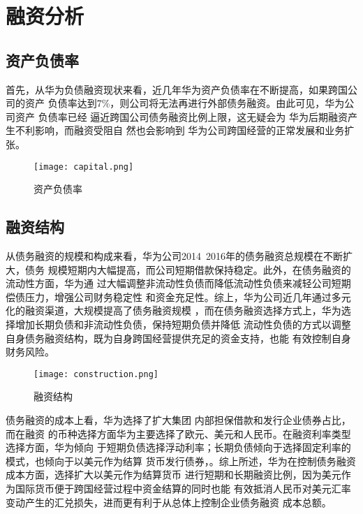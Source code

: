 \documentclass[../main]{subfiles}
\begin{document}
\chapter{融资分析}%
\label{cha:融资分析}

\section{资产负债率}%
\label{sec:资产负债率}

首先，从华为负债融资现状来看，近几年华为资产负债率在不断提高，如果跨国公司的资产
负债率达到7\%，则公司将无法再进行外部债务融资。由此可见，华为公司资产 负债率已经
逼近跨国公司债务融资比例上限，这无疑会为 华为后期融资产生不利影响，而融资受阻自
然也会影响到 华为公司跨国经营的正常发展和业务扩张。

\begin{figure}[htbp]
	\centering
	\texttt{[image: capital.png]}
	\caption{资产负债率}
	\label{fig:资产负债率}
\end{figure}

\section{融资结构}%
\label{sec:融资结构}

从债务融资的规模和构成来看，华为公司2014~2016年的债务融资总规模在不断扩大，债务
规模短期内大幅提高，而公司短期借款保持稳定。此外，在债务融资的流动性方面，华为通
过大幅调整非流动性负债而降低流动性负债来减轻公司短期偿债压力，增强公司财务稳定性
和资金充足性。综上，华为公司近几年通过多元化的融资渠道，大规模提高了债务融资规模
，而在债务融资选择方式上，华为选择增加长期负债和非流动性负债，保持短期负债并降低
流动性负债的方式以调整自身债务融资结构，既为自身跨国经营提供充足的资金支持，也能
有效控制自身财务风险。

\begin{figure}[htbp]
	\centering
	\texttt{[image: construction.png]}
	\caption{融资结构}
	\label{fig:融资结构}
\end{figure}

债务融资的成本上看，华为选择了扩大集团 内部担保借款和发行企业债券占比，而在融资
的币种选择方面华为主要选择了欧元、美元和人民币。在融资利率类型选择方面，华为倾向
于短期负债选择浮动利率；长期负债倾向于选择固定利率的模式，也倾向于以美元作为结算
货币发行债券，。综上所述，华为在控制债务融资成本方面，选择扩大以美元作为结算货币
进行短期和长期融资比例，因为美元作为国际货币便于跨国经营过程中资金结算的同时也能
有效抵消人民币对美元汇率变动产生的汇兑损失，进而更有利于从总体上控制企业债务融资
成本总额。
\end{document}
